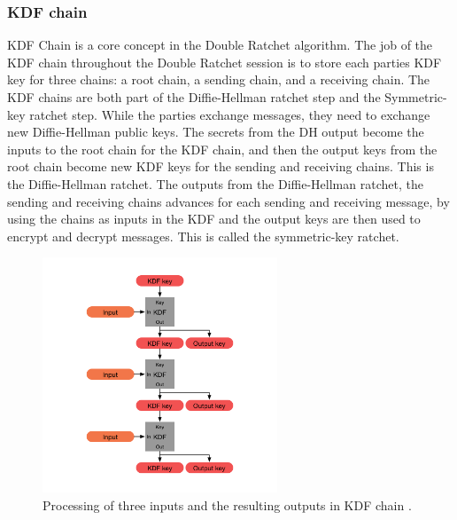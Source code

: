 \subsubsection{KDF chain}

KDF Chain is a core concept in the Double Ratchet algorithm.
The job of the KDF chain throughout the Double Ratchet session is to
store each parties KDF key for three chains: a root chain, a sending chain, and
a receiving chain.
The KDF chains are both part of the Diffie-Hellman ratchet step and
the Symmetric-key ratchet step. While the parties exchange messages, they
need to exchange new Diffie-Hellman public keys. The secrets from the DH
output become the inputs to the root chain for the KDF chain, and then the output keys from the root chain become new KDF keys for the sending and
receiving chains. This is the Diffie-Hellman ratchet.
The outputs from the Diffie-Hellman ratchet, the sending and receiving
chains advances for each sending and receiving message, by using the
chains as inputs in the KDF and the output keys are then used to encrypt
and decrypt messages. This is called the symmetric-key ratchet.

\begin{figure}[H]
	\centering
	\includegraphics[width=7cm]{figures/kdfchain.png}
	\caption{Processing of three inputs and the resulting outputs in KDF chain \cite{doubleratchet}.}
	\label{fig:kdfchain}
\end{figure}

